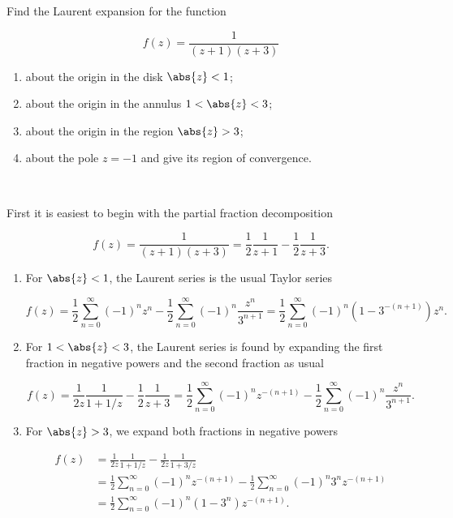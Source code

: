 \documentclass[english,a4paper,12pt]{report}
\begin{document}
{Find the Laurent expansion for the function

\begin{equation}
    f(z) = \frac{1}{(z+1)(z+3)} 
\end{equation}

\begin{enumerate}
    \item about the origin in the disk \(\abs{z} < 1 \);
    \item about the origin in the annulus \(1  < \abs{z} <3\);
    \item about the origin in the region \(\abs{z} > 3\);
    \item about the pole \(z = -1\) and give its region of convergence.
\end{enumerate}
~
}
{First it is easiest to begin with the partial fraction decomposition

\begin{equation}
    f(z) = \frac{1}{(z+1)(z+3)} = \frac{1}{2} \frac{1}{z+1} - \frac{1}{2} \frac{1}{z+3}.    
\end{equation}

\begin{enumerate}
    \item For \(\abs{z} <1 \), the Laurent series is the usual Taylor series 

    \begin{equation}
        f(z) = \frac{1}{2} \sum_{n=0}^{\infty} (-1)^{n} z^{n} -\frac{1}{2}  \sum_{n=0}^{\infty} (-1)^{n} \frac{z^{n} }{3^{n+1} } = \frac{1}{2} \sum_{n=0}^{\infty} (-1)^{n} (1-3^{-(n+1)} ) z^{n} .  
    \end{equation}

    \item For \(1 < \abs{z} < 3\), the Laurent series is found by expanding the first fraction in negative powers and the second fraction as usual
    
    \begin{equation}
        f(z) = \frac{1}{2z} \frac{1}{1+1 /z} - \frac{1}{2} \frac{1}{z+3} = \frac{1}{2} \sum_{n=0}^{\infty} (-1)^{n} z^{-(n+1)} - \frac{1}{2} \sum_{n=0}^{\infty} (-1)^{n} \frac{z^{n} }{3^{n+1} }.         
    \end{equation}

    \item For \(\abs{z} > 3\), we expand both fractions in negative powers
    
    \begin{equation}
        \begin{aligned} 
        f(z) &= \frac{1}{2z} \frac{1}{1+1 /z} - \frac{1}{2z} \frac{1}{1+3 /z} \\
        &= \frac{1}{2} \sum_{n=0}^{\infty} (-1)^{n}z^{-(n+1)} - \frac{1}{2} \sum_{n=0}^{\infty} (-1)^{n} 3^{n} z^{-(n+1)} \\
        &= \frac{1}{2} \sum_{n=0}^{\infty} (-1)^{n} (1-3^{n} ) z^{-(n+1)}.
        \end{aligned}             
    \end{equation}
    

\end{enumerate}}
\end{document}
